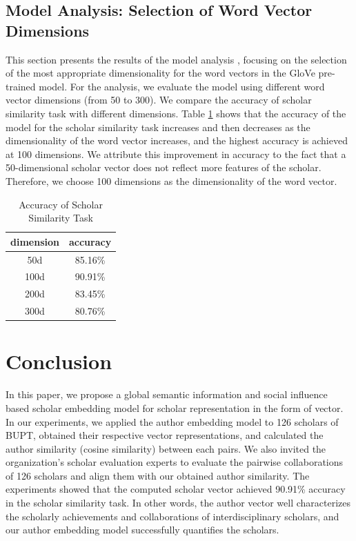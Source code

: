 \documentclass[conference]{IEEEtran}
\begin{document}
\subsection{Model Analysis: Selection of Word Vector Dimensions}
This section presents the results of the model analysis \cite{8318770}, focusing on the
selection of the most appropriate dimensionality for the word vectors in
the GloVe pre-trained model. For the analysis, we evaluate the model
using different word vector dimensions (from 50 to 300). We compare the
accuracy of scholar similarity task with different dimensions.
Table \ref{tab:addlabel} shows that the accuracy of the model for the scholar
similarity task increases and then decreases as the dimensionality of
the word vector increases, and the highest accuracy is achieved at 100
dimensions. We attribute this improvement in accuracy to the fact that a
50-dimensional scholar vector does not reflect more features of the
scholar. Therefore, we choose 100 dimensions as the dimensionality of the
word vector.

\begin{table}[htbp]
  \centering
  \caption{Accuracy of Scholar Similarity Task}
    \begin{tabular}{cc}
    \toprule
    \multicolumn{1}{l}{dimension} & \multicolumn{1}{l}{accuracy} \\
    \midrule
    50d   & 85.16\% \\
    100d  & 90.91\% \\
    200d  & 83.45\% \\
    300d  & 80.76\% \\
    \bottomrule
    \end{tabular}%
  \label{tab:addlabel}%
\end{table}%



\newpage
\section{Conclusion}
In this paper, we propose a global semantic information and social influence
based scholar embedding model for scholar representation in the form of vector.
In our experiments, we applied the author embedding model to 126 scholars of BUPT,
obtained their respective vector representations, and calculated the 
author similarity (cosine similarity) between each pairs. We also invited the organization's scholar evaluation experts to evaluate the pairwise collaborations of 126 scholars and align them with our obtained author similarity. The experiments showed that the computed scholar vector 
achieved 90.91\% accuracy in the scholar similarity task. In other words, 
the author vector well characterizes the scholarly achievements and 
collaborations of interdisciplinary scholars, and our author embedding 
model successfully quantifies the scholars.
\end{document}
